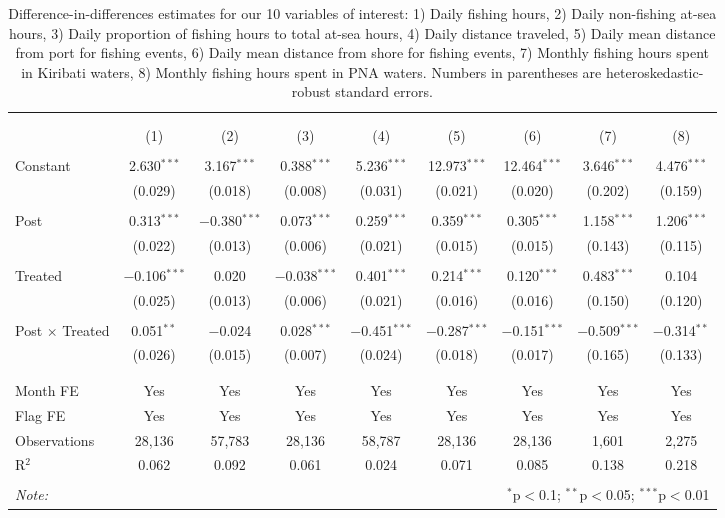 
\begin{table}[!htbp] \centering 
  \caption{\label{tab:main_DID}Difference-in-differences estimates for our 10 variables of interest: 1) Daily fishing hours, 2) Daily non-fishing at-sea hours, 3) Daily proportion of fishing hours to total at-sea hours, 4) Daily distance traveled, 5) Daily mean distance from port for fishing events, 6) Daily mean distance from shore for fishing events, 7) Monthly fishing hours spent in Kiribati waters, 8) Monthly fishing hours spent in PNA waters. Numbers in parentheses are heteroskedastic-robust standard errors.} 
  \label{} 
\footnotesize 
\begin{tabular}{@{\extracolsep{1pt}}lcccccccc} 
\\[-1.8ex]\hline 
\hline \\[-1.8ex] 
\\[-1.8ex] & (1) & (2) & (3) & (4) & (5) & (6) & (7) & (8)\\ 
\hline \\[-1.8ex] 
 Constant & 2.630$^{***}$ & 3.167$^{***}$ & 0.388$^{***}$ & 5.236$^{***}$ & 12.973$^{***}$ & 12.464$^{***}$ & 3.646$^{***}$ & 4.476$^{***}$ \\ 
  & (0.029) & (0.018) & (0.008) & (0.031) & (0.021) & (0.020) & (0.202) & (0.159) \\ 
  & & & & & & & & \\ 
 Post & 0.313$^{***}$ & $-$0.380$^{***}$ & 0.073$^{***}$ & 0.259$^{***}$ & 0.359$^{***}$ & 0.305$^{***}$ & 1.158$^{***}$ & 1.206$^{***}$ \\ 
  & (0.022) & (0.013) & (0.006) & (0.021) & (0.015) & (0.015) & (0.143) & (0.115) \\ 
  & & & & & & & & \\ 
 Treated & $-$0.106$^{***}$ & 0.020 & $-$0.038$^{***}$ & 0.401$^{***}$ & 0.214$^{***}$ & 0.120$^{***}$ & 0.483$^{***}$ & 0.104 \\ 
  & (0.025) & (0.013) & (0.006) & (0.021) & (0.016) & (0.016) & (0.150) & (0.120) \\ 
  & & & & & & & & \\ 
 Post $\times$ Treated & 0.051$^{**}$ & $-$0.024 & 0.028$^{***}$ & $-$0.451$^{***}$ & $-$0.287$^{***}$ & $-$0.151$^{***}$ & $-$0.509$^{***}$ & $-$0.314$^{**}$ \\ 
  & (0.026) & (0.015) & (0.007) & (0.024) & (0.018) & (0.017) & (0.165) & (0.133) \\ 
  & & & & & & & & \\ 
\hline \\[-1.8ex] 
Month FE & Yes & Yes & Yes & Yes & Yes & Yes & Yes & Yes \\ 
Flag FE & Yes & Yes & Yes & Yes & Yes & Yes & Yes & Yes \\ 
Observations & 28,136 & 57,783 & 28,136 & 58,787 & 28,136 & 28,136 & 1,601 & 2,275 \\ 
R$^{2}$ & 0.062 & 0.092 & 0.061 & 0.024 & 0.071 & 0.085 & 0.138 & 0.218 \\ 
\hline 
\hline \\[-1.8ex] 
\textit{Note:}  & \multicolumn{8}{r}{$^{*}$p$<$0.1; $^{**}$p$<$0.05; $^{***}$p$<$0.01} \\ 
\end{tabular} 
\end{table} 
